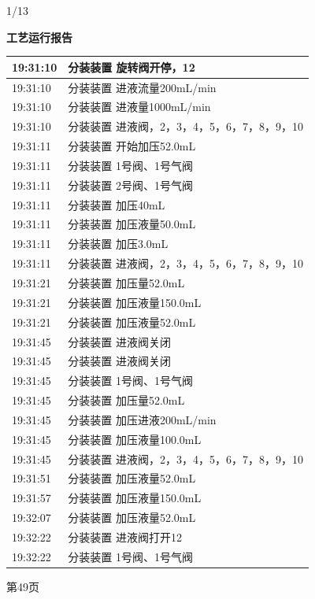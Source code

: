 \documentclass[UTF8,10pt,a4paper,fontset=fandol]{ctexart}
\newcommand{\handwritten}[1]{#1}
\begin{document}
\vfill

\handwritten{1/13}

\newpage

\noindent
\begin{minipage}[t]{0.48\linewidth}
\centering
\textbf{工艺运行报告}\\[2pt]
\small
\begin{tabular}{|p{1.35cm}|p{4.65cm}|}
\hline
19:31:10 & 分装装置 旋转阀开停，12 \\ \hline
19:31:10 & 分装装置 进液流量200mL/min \\ \hline
19:31:10 & 分装装置 进液量1000mL/min \\ \hline
19:31:10 & 分装装置 进液阀，2，3，4，5，6，7，8，9，10 \\ \hline
19:31:11 & 分装装置 开始加压52.0mL \\ \hline
19:31:11 & 分装装置 1号阀、1号气阀 \\ \hline
19:31:11 & 分装装置 2号阀、1号气阀 \\ \hline
19:31:11 & 分装装置 加压40mL \\ \hline
19:31:11 & 分装装置 加压液量50.0mL \\ \hline
19:31:11 & 分装装置 加压3.0mL \\ \hline
19:31:11 & 分装装置 进液阀，2，3，4，5，6，7，8，9，10 \\ \hline
19:31:21 & 分装装置 加压量52.0mL \\ \hline
19:31:21 & 分装装置 加压液量150.0mL \\ \hline
19:31:21 & 分装装置 加压液量52.0mL \\ \hline
19:31:45 & 分装装置 进液阀关闭 \\ \hline
19:31:45 & 分装装置 进液阀关闭 \\ \hline
19:31:45 & 分装装置 1号阀、1号气阀 \\ \hline
19:31:45 & 分装装置 加压量52.0mL \\ \hline
19:31:45 & 分装装置 加压进液200mL/min \\ \hline
19:31:45 & 分装装置 加压液量100.0mL \\ \hline
19:31:45 & 分装装置 进液阀，2，3，4，5，6，7，8，9，10 \\ \hline
19:31:51 & 分装装置 加压液量52.0mL \\ \hline
19:31:57 & 分装装置 加压液量150.0mL \\ \hline
19:32:07 & 分装装置 加压液量52.0mL \\ \hline
19:32:22 & 分装装置 进液阀打开12 \\ \hline
19:32:22 & 分装装置 1号阀、1号气阀 \\ \hline
\end{tabular}

\vspace{2pt}
第49页
\end{minipage}
\end{document}
